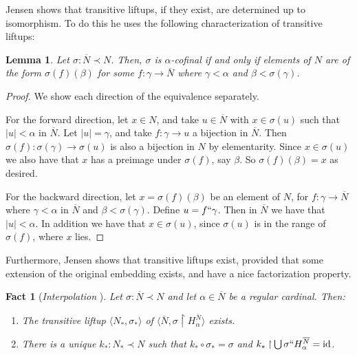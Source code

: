 \documentclass{amsart}
\newtheorem{lemma}[theorem]{Lemma}
\newtheorem{fact}[theorem]{Fact}
\theoremstyle{definition}
\theoremstyle{remark}
\newcommand{\N}{{\overline{N}}}
\newcommand{\id}{\textup{\ensuremath{\text{id}}}}
\newcommand{\rest}{\mathbin{\upharpoonright}}
\begin{document}
Jensen \cite[Lemma 3.1]{Jensen:2014} shows  that transitive liftups, if they exist, are determined up to isomorphism. To do this he uses the following characterization of transitive liftups:
\begin{lemma}\label{lemma:liftupchar} Let $\sigma: \N \prec N$. Then,
$\sigma$ is $\alpha$-cofinal if and only if elements of $N$ are of the form $\sigma(f)(\beta)$ for some $f: \gamma \to \overline N$ where $\gamma < \alpha$ and $\beta < \sigma(\gamma)$. \end{lemma} 
\begin{proof} We show each direction of the equivalence separately.

For the forward direction, let $x \in N$, and take $u \in \overline N$ with $x \in \sigma(u)$ such that $|u| <\alpha$ in $\overline N$. Let $|u|=\gamma$, and take $f:\gamma \to u$ a bijection in $\overline N$. Then $\sigma(f):\sigma(\gamma) \to \sigma(u)$ is also a bijection in $N$ by elementarity. Since $x \in \sigma(u)$ we also have that $x$ has a preimage under $\sigma(f)$, say $\beta$. So $\sigma(f)(\beta)=x$ as desired.

For the backward direction, let $x=\sigma(f)(\beta)$ be an element of $N$, for $f:\gamma \to \overline N$ where $\gamma < \alpha$ in $\overline N$ and $\beta < \sigma(\gamma)$. Define $u = f``\gamma$. Then in $\overline N$ we have that $|u|<\alpha$. In addition we have that $x \in \sigma(u)$, since $\sigma(u)$ is in the range of $\sigma(f)$, where $x$ lies.
\end{proof}

Furthermore, Jensen shows that transitive liftups exist, provided that some extension of the original embedding exists, and have a nice factorization property.

\begin{fact}[\emph{Interpolation} {\cite[Lemma 5.1]{Jensen:2014}}]\label{fact:Interpolation} Let $\sigma:\N \prec N$ and let $\alpha \in \N$ be a regular cardinal. Then: \begin{enumerate}
	\item The transitive liftup $\langle N_*, \sigma_* \rangle$ of $\langle \N, \sigma \rest H^{\N}_\alpha \rangle$ exists.
	\item There is a unique $k_*:N_* \prec N$ such that $k_* \circ \sigma_* = \sigma$ and $k_* \rest \bigcup \sigma `` H^{\N}_\alpha = \id$.
\end{enumerate}
\end{fact} 
\end{document}

